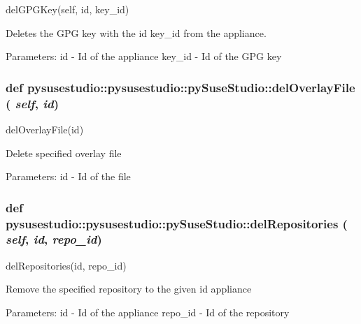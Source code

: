 \label{classpysusestudio_1_1pysusestudio_1_1py_suse_studio_aca86db22c80d6e133b7f3524af48e4e5}
\begin{DoxyVerb}delGPGKey(self, id, key_id)

        Deletes the GPG key with the id key_id from the appliance. 
            
            Parameters:
id - Id of the appliance
key_id - Id of the GPG key

\end{DoxyVerb}
 \hypertarget{classpysusestudio_1_1pysusestudio_1_1py_suse_studio_a100300b23d48d663aac88ab1b8c1c5c9}{
\subsubsection[{delOverlayFile}]{\setlength{\rightskip}{0pt plus 5cm}def pysusestudio::pysusestudio::pySuseStudio::delOverlayFile ( {\em self}, \/   {\em id})}}
\label{classpysusestudio_1_1pysusestudio_1_1py_suse_studio_a100300b23d48d663aac88ab1b8c1c5c9}
\begin{DoxyVerb}delOverlayFile(id)

            Delete specified overlay file
            
            Parameters:
id - Id of the file

\end{DoxyVerb}
 \hypertarget{classpysusestudio_1_1pysusestudio_1_1py_suse_studio_aca14bff0d5452a09dcd1b75a534eea76}{
\subsubsection[{delRepositories}]{\setlength{\rightskip}{0pt plus 5cm}def pysusestudio::pysusestudio::pySuseStudio::delRepositories ( {\em self}, \/   {\em id}, \/   {\em repo\_\-id})}}
\label{classpysusestudio_1_1pysusestudio_1_1py_suse_studio_aca14bff0d5452a09dcd1b75a534eea76}
\begin{DoxyVerb}delRepositories(id, repo_id)

            Remove the specified repository to the given id appliance
            
            Parameters:
id - Id of the appliance
repo_id - Id of the repository

\end{DoxyVerb}

